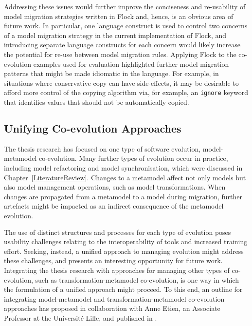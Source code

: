 Addressing these issues would further improve the conciseness and re-usability of model migration strategies written in Flock and, hence, is an obvious area of future work. In particular, one language construct is used to control two concerns of a model migration strategy in the current implementation of Flock, and introducing separate language constructs for each concern would likely increase the potential for re-use between model migration rules. Applying Flock to the co-evolution examples used for evaluation highlighted further model migration patterns that might be made idiomatic in the language. For example, in situations where conservative copy can have side-effects, it may be desirable to afford more control of the copying algorithm via, for example, an \texttt{ignore} keyword that identifies values that should not be automatically copied.


\subsection{Unifying Co-evolution Approaches}
The thesis research has focused on one type of software evolution, model-metamodel co-evolution. Many further types of evolution occur in practice, including model refactoring and model synchronisation, which were discussed in Chapter~\ref{LiteratureReview}. Changes to a metamodel affect not only models but also model management operations, such as model transformations. When changes are propagated from a metamodel to a model during migration, further artefacts might be impacted as an indirect consequence of the metamodel evolution.

The use of distinct structures and processes for each type of evolution poses usability challenges relating to the interoperability of tools and increased training effort. Seeking, instead, a unified approach to managing evolution might address these challenges, and presents an interesting opportunity for future work. Integrating the thesis research with approaches for managing other types of co-evolution, such as transformation-metamodel co-evolution, is one way in which the formulation of a unified approach might proceed. To this end, an outline for integrating model-metamodel and transformation-metamodel co-evolution approaches has proposed in collaboration with Anne Etien, an Associate Professor at the Universit\'{e} Lille, and published in \cite{rose10coevolution}.


